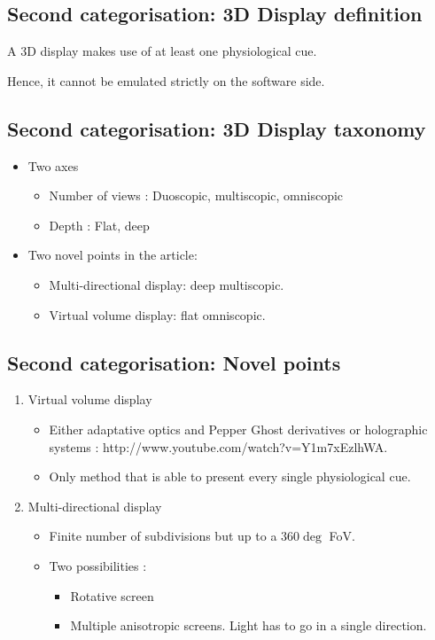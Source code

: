 \subsection{Second categorisation: 3D Display definition}
\begin{frame}
\begin{center}
\centering
A 3D display makes use of at least one physiological cue.
\end{center}

Hence, it cannot be emulated strictly on the software side.
\end{frame}
\subsection{Second categorisation: 3D Display taxonomy}
\begin{frame}
\begin{itemize}
\item Two axes
\begin{itemize}
\item Number of views : Duoscopic, multiscopic, omniscopic
\item Depth : Flat, deep
\end{itemize}
\item Two novel points in the article: 
\begin{itemize}
\item Multi-directional display: deep multiscopic.
\item Virtual volume display: flat omniscopic.
\end{itemize}
\end{itemize}
\end{frame}
\subsection{Second categorisation: Novel points}
\begin{frame}
\begin{enumerate}
\item \Large{Virtual volume display}
\begin{itemize}
\item Either adaptative optics and Pepper Ghost derivatives or holographic systems : http://www.youtube.com/watch?v=Y1m7xEzlhWA.
\item Only method that is able to present every single physiological cue.
\end{itemize}
\item \Large{Multi-directional display}
\begin{itemize}
\item Finite number of subdivisions but up to a $360\deg$ FoV.
\item Two possibilities : 
\begin{itemize}
\item Rotative screen
\item Multiple anisotropic screens. Light has to go in a single direction.
\end{itemize}
\end{itemize}
\end{enumerate}
\end{frame}